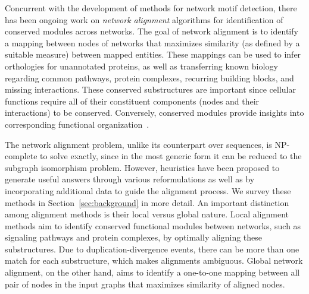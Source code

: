 \documentclass[10pt, journal, compsoc, final]{IEEEtran}
\begin{document}
Concurrent with the development of methods for network motif detection,
there has been ongoing work on \textit{network alignment} algorithms
for identification of conserved modules across networks. The goal of network alignment
is to identify a mapping between nodes of networks that maximizes similarity (as
defined by a suitable measure) between mapped entities. These mappings can be used to infer
orthologies for unannotated proteins, as well as transferring known biology regarding common
pathways, protein complexes, recurring building blocks, and missing interactions.
These conserved substructures are important since cellular functions require
all of their constituent components (nodes and their interactions) to be conserved.
Conversely, conserved modules provide insights into corresponding functional
organization~\cite{molecular2modular}.

The network alignment problem, unlike its counterpart over sequences, is NP-complete to
solve exactly, since in the most generic form it can be reduced to the subgraph
isomorphism problem. However, heuristics have been proposed 
to generate useful answers through various reformulations as well as
by incorporating additional data to guide the alignment process. We survey
these methods in Section~\ref{sec:background} in more detail. 
An important distinction among alignment methods is their local versus global nature. Local alignment methods aim to identify conserved functional modules between networks, such as signaling pathways and protein complexes, by optimally aligning these substructures. Due to duplication-divergence events, there can be more than one match for each substructure, which makes alignments ambiguous. Global network alignment, on the other hand, aims to identify a one-to-one mapping between all pair of nodes in the input graphs that maximizes similarity of aligned nodes.
\end{document}

